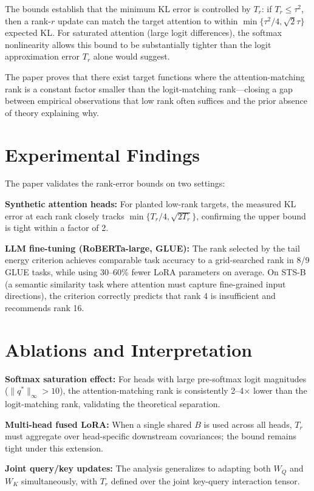\documentclass[10pt,twocolumn]{article}
\begin{document}
The bounds establish that the minimum KL error is controlled by $T_r$:
if $T_r \leq \tau^2$, then a rank-$r$ update can match the target
attention to within $\min\{\tau^2/4, \sqrt{2}\tau\}$ expected KL. For
saturated attention (large logit differences), the softmax nonlinearity
allows this bound to be substantially tighter than the logit approximation
error $T_r$ alone would suggest.

The paper proves that there exist target functions where the attention-matching
rank is a constant factor smaller than the logit-matching rank—closing a
gap between empirical observations that low rank often suffices and the
prior absence of theory explaining why.

\section{Experimental Findings}

The paper validates the rank-error bounds on two settings:

\textbf{Synthetic attention heads:} For planted low-rank targets, the
measured KL error at each rank closely tracks $\min\{T_r/4, \sqrt{2T_r}\}$,
confirming the upper bound is tight within a factor of 2.

\textbf{LLM fine-tuning (RoBERTa-large, GLUE):} The rank selected by the
tail energy criterion achieves comparable task accuracy to a grid-searched
rank in 8/9 GLUE tasks, while using 30--60\% fewer LoRA parameters on
average. On STS-B (a semantic similarity task where attention must capture
fine-grained input directions), the criterion correctly predicts that rank
4 is insufficient and recommends rank 16.

\section{Ablations and Interpretation}

\textbf{Softmax saturation effect:} For heads with large pre-softmax
logit magnitudes ($\|q^*\|_\infty > 10$), the attention-matching rank is
consistently 2--4$\times$ lower than the logit-matching rank, validating
the theoretical separation.

\textbf{Multi-head fused LoRA:} When a single shared $B$ is used across
all heads, $T_r$ must aggregate over head-specific downstream covariances;
the bound remains tight under this extension.

\textbf{Joint query/key updates:} The analysis generalizes to adapting
both $W_Q$ and $W_K$ simultaneously, with $T_r$ defined over the joint
key-query interaction tensor.
\end{document}
